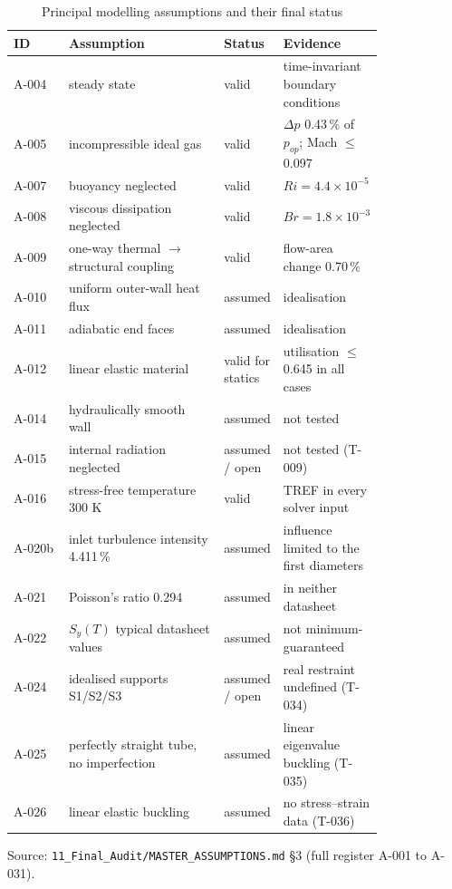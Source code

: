 \begin{table}[htbp]
\centering
\footnotesize
\caption{Principal modelling assumptions and their final status}
\label{tab:assumptions}
\begin{tabular}{l>{\raggedright\arraybackslash}p{0.42\linewidth}>{\raggedright\arraybackslash}p{0.14\linewidth}>{\raggedright\arraybackslash}p{0.25\linewidth}}
\toprule
ID & Assumption & Status & Evidence \\
\midrule
A-004 & steady state & valid & time-invariant boundary conditions \\
A-005 & incompressible ideal gas & valid & $\Delta p$ 0.43\,\% of $p_{op}$; Mach $\le$ 0.097 \\
A-007 & buoyancy neglected & valid & $Ri = 4.4\times10^{-5}$ \\
A-008 & viscous dissipation neglected & valid & $Br = 1.8\times10^{-3}$ \\
A-009 & one-way thermal $\rightarrow$ structural coupling & valid & flow-area change 0.70\,\% \\
A-010 & uniform outer-wall heat flux & assumed & idealisation \\
A-011 & adiabatic end faces & assumed & idealisation \\
A-012 & linear elastic material & valid for statics & utilisation $\le$ 0.645 in all cases \\
A-014 & hydraulically smooth wall & assumed & not tested \\
A-015 & internal radiation neglected & assumed / open & not tested (T-009) \\
A-016 & stress-free temperature 300 K & valid & TREF in every solver input \\
A-020b & inlet turbulence intensity 4.411\,\% & assumed & influence limited to the first diameters \\
A-021 & Poisson's ratio 0.294 & assumed & in neither datasheet \\
A-022 & $S_y(T)$ typical datasheet values & assumed & not minimum-guaranteed \\
A-024 & idealised supports S1/S2/S3 & assumed / open & real restraint undefined (T-034) \\
A-025 & perfectly straight tube, no imperfection & assumed & linear eigenvalue buckling (T-035) \\
A-026 & linear elastic buckling & assumed & no stress--strain data (T-036) \\
\bottomrule
\end{tabular}
\par\smallskip\parbox{\linewidth}{\footnotesize\raggedright Source: \texttt{11\_Final\_Audit/MASTER\_ASSUMPTIONS.md} \S3 (full register A-001 to A-031).}
\end{table}
